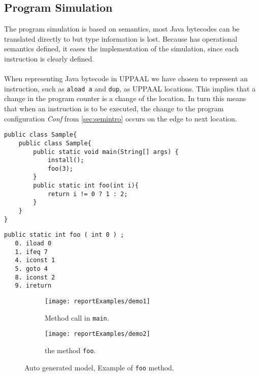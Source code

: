 \subsection{Program Simulation}
The program simulation is based on \jcl semantics, most Java bytecodes can be translated directly to \jcl but type information is lost. Because \jcl has operational semantics defined, it eases the implementation of the simulation, since each instruction is clearly defined.\\\\
When representing Java bytecode in UPPAAL we have chosen to represent an instruction, such as \texttt{aload a} and \texttt{dup}, as UPPAAL locations. 
This implies that a change in the program counter is a change of the location. 
In turn this means that when an instruction is to be executed, the change to the program configuration \textit{Conf} from  \cref{sec:semintro} occurs on the edge to next location.

\begin{minipage}{\linewidth}
\begin{lstlisting}[caption=Java code sample.]
public class Sample{
    public class Sample{
        public static void main(String[] args) {
            install();
            foo(3);
        }
        public static int foo(int i){
            return i != 0 ? 1 : 2;
        }
    }
}
\end{lstlisting}
\end{minipage}
\begin{minipage}{\linewidth}
\begin{lstlisting}[caption=Bytecode sample.]
public static int foo ( int 0 ) ;
   0. iload 0
   1. ifeq 7
   4. iconst 1
   5. goto 4
   8. iconst 2
   9. ireturn
\end{lstlisting}
\end{minipage}

\begin{figure}
\begin{subfigure}{\textwidth}
	\texttt{[image: reportExamples/demo1]}
	\caption{Method call in \texttt{main}.}
\end{subfigure}
\begin{subfigure}{\textwidth}
	\texttt{[image: reportExamples/demo2]}
	\caption{the method \texttt{foo}.}

\end{subfigure}

\caption{Auto generated model, Example of \texttt{foo} method.}
\label{fig:fooMethod}
\end{figure}


